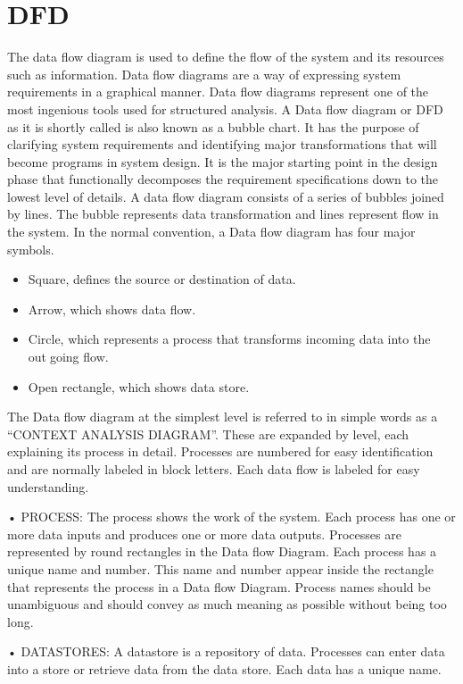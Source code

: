 \section{DFD}
\par \hspace{1cm} The data flow diagram is used to define the flow of the system and its resources
such as information. Data flow diagrams are a way of expressing system requirements
in a graphical manner. Data flow diagrams represent one of the most ingenious tools
used for structured analysis. A Data flow diagram or DFD as it is shortly called is
also known as a bubble chart. It has the purpose of clarifying system requirements
and identifying major transformations that will become programs in system design.
It is the major starting point in the design phase that functionally decomposes the
requirement specifications down to the lowest level of details.
A data flow diagram consists of a series of bubbles joined by lines. The bubble
represents data transformation and lines represent flow in the system. In the normal
convention, a Data flow diagram has four major symbols.
\begin{itemize}
    \item Square, defines the source or destination of data.
    \item Arrow, which shows data flow. 
    \item Circle, which represents a process that transforms incoming data into the outgoing flow.
    \item Open rectangle, which shows data store.
\end{itemize}
The Data flow diagram at the simplest level is referred to in simple words as
a “CONTEXT ANALYSIS DIAGRAM”. These are expanded by level, each
explaining its process in detail. Processes are numbered for easy identification
and are normally labeled in block letters. Each data flow is labeled for easy
understanding.
\par • PROCESS: The process shows the work of the system. Each process has one
or more data inputs and produces one or more data outputs. Processes are
represented by round rectangles in the Data flow Diagram. Each process has a
unique name and number. This name and number appear inside the rectangle
that represents the process in a Data flow Diagram. Process names should be
unambiguous and should convey as much meaning as possible without being
too long.
\par • DATASTORES: A datastore is a repository of data. Processes can enter data
into a store or retrieve data from the data store. Each data has a unique name.
